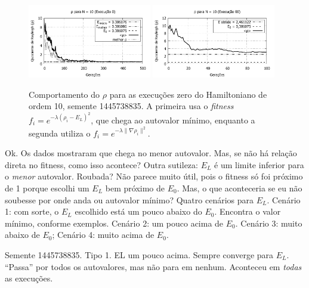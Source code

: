 	
	\begin{figure}[htbp]
		\centering
			\includegraphics[width=0.48\textwidth]{figs/resultados/fitnessEL/N-10_E-0_rho.pdf}
			\includegraphics[width=0.48\textwidth]{figs/resultados/fitnessGrad/N10_00_rho.pdf}
		\caption{Comportamento do $\rho$ para as execuções zero do Hamiltoniano de ordem 10, semente 1445738835. A primeira usa o \textit{fitness} $f_i = e^{-\lambda(\rho_i - E_L)^2}$, que chega ao autovalor mínimo, enquanto a segunda utiliza o $f_i = e^{-\lambda \| \nabla \rho_i \|^2}$.}
		\label{fig:N-10_E-0_rho_comparacao}
	\end{figure}
	
	
	
		
	
	Ok. Os dados mostraram que chega no menor autovalor. Mas, se não há relação direta no fitness, como isso acontece? Outra sutileza: $E_L$ é um limite inferior para o \textit{menor} autovalor. Roubada? Não parece muito útil, pois o fitness só foi próximo de 1 porque escolhi um $E_L$ bem próximo de $E_0$. Mas, o que aconteceria se eu não soubesse por onde anda ou autovalor mínimo? Quatro cenários para $E_L$. Cenário 1: com sorte, o $E_L$ escolhido está um pouco abaixo do $E_0$. Encontra o valor mínimo, conforme exemplos. Cenário 2: um pouco acima de $E_0$. Cenário 3: muito abaixo de $E_0$; Cenário 4: muito acima de $E_0$.
	
	
	Semente 1445738835. Tipo 1. EL um pouco acima. Sempre converge para $E_L$. ``Passa'' por todos os autovalores, mas não para em nenhum. Aconteceu em \emph{todas} as execuções.
	
